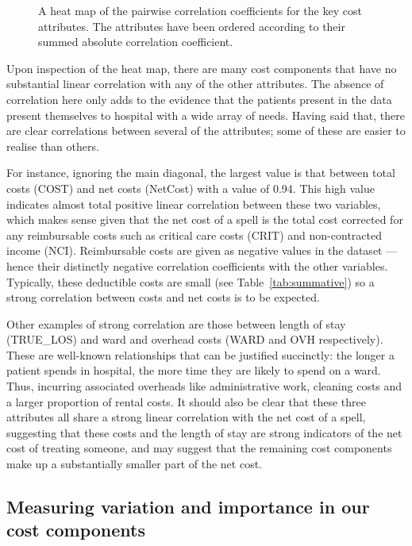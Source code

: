 \begin{figure}[htbp]
    \caption{A heat map of the pairwise correlation coefficients for the key
        cost attributes. The attributes have been ordered according to their
        summed absolute correlation coefficient.}%
    \label{fig:corr_heatmap}
\end{figure}

Upon inspection of the heat map, there are many cost components that have no
substantial linear correlation with any of the other attributes. The absence of
correlation here only adds to the evidence that the patients present in the data
present themselves to hospital with a wide array of needs. Having said that,
there are clear correlations between several of the attributes; some of these
are easier to realise than others.

For instance, ignoring the main diagonal, the largest value is that between
total costs (COST) and net costs (NetCost) with a value of 0.94. This high value
indicates almost total positive linear correlation between these two variables,
which makes sense given that the net cost of a spell is the total cost corrected
for any reimbursable costs such as critical care costs (CRIT) and non-contracted
income (NCI). Reimbursable costs are given as negative values in the dataset ---
hence their distinctly negative correlation coefficients with the other
variables. Typically, these deductible costs are small
(see Table~\ref{tab:summative}) so a strong correlation between costs and net
costs is to be expected.

Other examples of strong correlation are those between length of stay
(TRUE\_LOS) and ward and overhead costs (WARD and OVH respectively). These are
well-known relationships that can be justified succinctly: the longer a patient
spends in hospital, the more time they are likely to spend on a ward. Thus,
incurring associated overheads like administrative work, cleaning costs and a
larger proportion of rental costs. It should also be clear that these three
attributes all share a strong linear correlation with the net cost of a spell,
suggesting that these costs and the length of stay are strong indicators of the
net cost of treating someone, and may suggest that the remaining cost components
make up a substantially smaller part of the net cost.


\subsection{Measuring variation and importance in our cost components}

